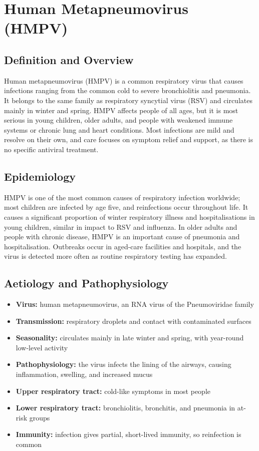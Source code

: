 \chapter{Human Metapneumovirus (HMPV)}

\section*{Definition and Overview}
Human metapneumovirus (HMPV) is a common respiratory virus that causes infections ranging from the common cold to severe bronchiolitis and pneumonia. It belongs to the same family as respiratory syncytial virus (RSV) and circulates mainly in winter and spring. HMPV affects people of all ages, but it is most serious in young children, older adults, and people with weakened immune systems or chronic lung and heart conditions. Most infections are mild and resolve on their own, and care focuses on symptom relief and support, as there is no specific antiviral treatment.

\section*{Epidemiology}
HMPV is one of the most common causes of respiratory infection worldwide; most children are infected by age five, and reinfections occur throughout life. It causes a significant proportion of winter respiratory illness and hospitalisations in young children, similar in impact to RSV and influenza. In older adults and people with chronic disease, HMPV is an important cause of pneumonia and hospitalisation. Outbreaks occur in aged-care facilities and hospitals, and the virus is detected more often as routine respiratory testing has expanded.

\section*{Aetiology and Pathophysiology}
\begin{itemize}
    \item \textbf{Virus:} human metapneumovirus, an RNA virus of the Pneumoviridae family
    \item \textbf{Transmission:} respiratory droplets and contact with contaminated surfaces
    \item \textbf{Seasonality:} circulates mainly in late winter and spring, with year-round low-level activity
    \item \textbf{Pathophysiology:} the virus infects the lining of the airways, causing inflammation, swelling, and increased mucus
    \item \textbf{Upper respiratory tract:} cold-like symptoms in most people
    \item \textbf{Lower respiratory tract:} bronchiolitis, bronchitis, and pneumonia in at-risk groups
    \item \textbf{Immunity:} infection gives partial, short-lived immunity, so reinfection is common
\end{itemize}

